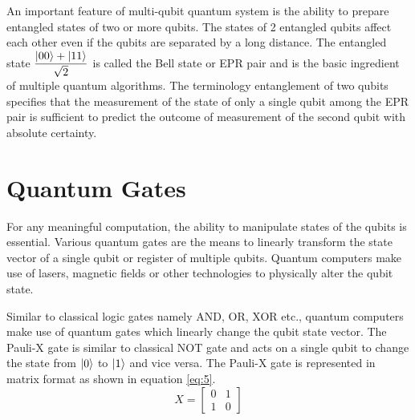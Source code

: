 \documentclass[english,a4paper,11pt,oneside,onecolumn]{book}
\begin{document}
An important feature of multi-qubit quantum system is the ability to prepare entangled states of two or more qubits. The states of 2 entangled qubits affect each other even if the qubits are separated by a long distance. The entangled state \(\dfrac{\ket{00} + \ket{11}}{\sqrt{2}}\) is called the Bell state or EPR pair and is the basic ingredient of multiple quantum algorithms. The terminology entanglement of two qubits specifies that the measurement of the state of only a single qubit among the EPR pair is sufficient to predict the outcome of measurement of the second qubit with absolute certainty.

\section{Quantum Gates}
\label{sec:qGates}
For any meaningful computation, the ability to manipulate states of the qubits is essential. Various quantum gates are the means to linearly transform the state vector of a single qubit or register of multiple qubits. Quantum computers make use of lasers, magnetic fields or other technologies to physically alter the qubit state.

Similar to classical logic gates namely AND, OR, XOR etc., quantum computers make use of quantum gates which linearly change the qubit state vector. The Pauli-X gate is similar to classical NOT gate and acts on a single qubit to change the state from \(\ket{0}\) to \(\ket{1}\) and vice versa. The Pauli-X gate is represented in matrix format as shown in equation \ref{eq:5}.
\begin{equation}\label{eq:5}
X = 
\begin{bmatrix}
0 & 1\\
1 & 0
\end{bmatrix}
\end{equation}
\end{document}
